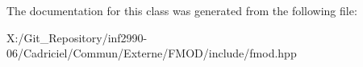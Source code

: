 The documentation for this class was generated from the following file\-:\begin{DoxyCompactItemize}
\item 
X\-:/\-Git\-\_\-\-Repository/inf2990-\/06/\-Cadriciel/\-Commun/\-Externe/\-F\-M\-O\-D/include/fmod.\-hpp\end{DoxyCompactItemize}
